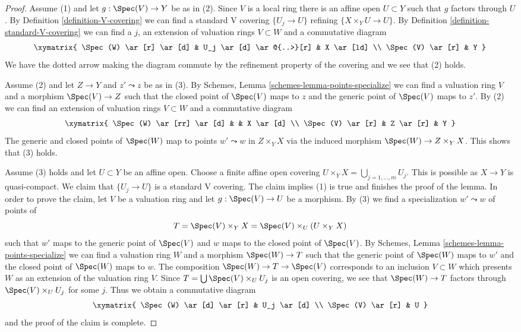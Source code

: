 \begin{proof}
Assume (1) and let $g : \Spec(V) \to Y$ be as in (2).
Since $V$ is a local ring there is an affine open $U \subset Y$
such that $g$ factors through $U$. By Definition \ref{definition-V-covering}
we can find a standard V covering $\{U_j \to U\}$ refining
$\{X \times_Y U \to U\}$. By Definition \ref{definition-standard-V-covering}
we can find a $j$, an extension of valuation rings $V \subset W$
and a commutative diagram
$$
\xymatrix{
\Spec(W) \ar[r] \ar[d] & U_j \ar[d] \ar@{..>}[r] & X \ar[ld] \\
\Spec(V) \ar[r] & Y
}
$$
We have the dotted arrow making the diagram commute by the refinement
property of the covering and we see that (2) holds.

\medskip\noindent
Assume (2) and let $Z \to Y$ and $z' \leadsto z$ be as in (3).
By Schemes, Lemma \ref{schemes-lemma-points-specialize}
we can find a valuation ring $V$ and a morphism $\Spec(V) \to Z$
such that the closed point of $\Spec(V)$ maps to $z$ and the
generic point of $\Spec(V)$ maps to $z'$. By (2) we can find an
extension of valuation rings $V \subset W$ and a
commutative diagram
$$
\xymatrix{
\Spec(W) \ar[rr] \ar[d] & & X \ar[d] \\
\Spec(V) \ar[r] & Z \ar[r] & Y
}
$$
The generic and closed points of $\Spec(W)$ map to points
$w' \leadsto w$ in $Z \times_Y X$ via the
induced morphism $\Spec(W) \to Z \times_Y X$.
This shows that (3) holds.

\medskip\noindent
Assume (3) holds and let $U \subset Y$ be an affine open.
Choose a finite affine open covering
$U \times_Y X = \bigcup_{j = 1, \ldots, m} U_j$.
This is possible as $X \to Y$ is quasi-compact.
We claim that $\{U_j \to U\}$ is a standard V covering.
The claim implies (1) is true and finishes the proof of the lemma.
In order to prove the claim, let $V$ be a valuation ring
and let $g : \Spec(V) \to U$ be a morphism.
By (3) we find a specialization $w' \leadsto w$ of
points of
$$
T = \Spec(V) \times_Y X = \Spec(V) \times_U (U \times_Y X)
$$
such that $w'$ maps to the generic point of $\Spec(V)$
and $w$ maps to the closed point of $\Spec(V)$.
By Schemes, Lemma \ref{schemes-lemma-points-specialize}
we can find a valuation ring $W$ and a morphism
$\Spec(W) \to T$ such that the generic point of $\Spec(W)$
maps to $w'$ and the closed point of $\Spec(W)$ maps to $w$.
The composition $\Spec(W) \to T \to \Spec(V)$ corresponds
to an inclusion $V \subset W$ which presents $W$ as an
extension of the valuation ring $V$.
Since $T = \bigcup \Spec(V) \times_U U_j$ is an open
covering, we see that $\Spec(W) \to T$ factors through
$\Spec(V) \times_U U_j$ for some $j$. Thus we obtain
a commutative diagram
$$
\xymatrix{
\Spec(W) \ar[d] \ar[r] & U_j \ar[d] \\
\Spec(V) \ar[r] & U
}
$$
and the proof of the claim is complete.
\end{proof}


